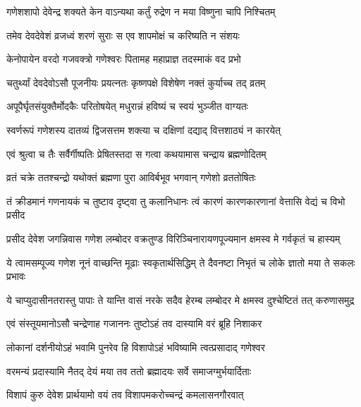 \twolineshloka
{गणेशशापो देवेन्द्र शक्यते केन वाऽन्यथा}
{कर्तुं रुद्रेण न मया विष्णुना चापि निश्चितम्}%

\twolineshloka
{तमेव देवदेवेशं व्रजध्वं शरणं सुराः}
{स एव शापमोक्षं च करिष्यति न संशयः}%


\twolineshloka
{केनोपायेन वरदो गजवक्त्रो गणेश्वरः}
{पितामह महाप्राज्ञ तदस्माकं वद प्रभो}%


\twolineshloka
{चतुर्थ्यां देवदेवोऽसौ पूजनीयः प्रयत्नतः}
{कृष्णपक्षे विशेषेण नक्तं कुर्याच्च तद् व्रतम्}%

\twolineshloka
{अपूपैर्घृतसंयुक्तैर्मोदकैः परितोषयेत्}
{मधुरान्नं हविष्यं च स्वयं भुञ्जीत वाग्यतः}%

\twolineshloka
{स्वर्णरूपं गणेशस्य दातव्यं द्विजसत्तम}
{शक्त्या च दक्षिणां दद्याद् वित्तशाठ्यं न कारयेत्}%

\twolineshloka
{एवं श्रुत्वा च तैः सर्वैर्गीष्पतिः प्रेषितस्तदा}
{स गत्वा कथयामास चन्द्राय ब्रह्मणोदितम्}%

\twolineshloka
{व्रतं चक्रे ततश्चन्द्रो यथोक्तं ब्रह्मणा पुरा}
{आविर्बभूव भगवान् गणेशो व्रततोषितः}%

\fourlineindentedshloka
{तं क्रीडमानं गणनायकं च}
{तुष्टाव दृष्ट्वा तु कलानिधानः}
{त्वं कारणं कारणकारणानां}
{वेत्तासि वेद्यं च विभो प्रसीद}%

\fourlineindentedshloka
{प्रसीद देवेश जगन्निवास}
{गणेश लम्बोदर वक्रतुण्ड}
{विरिञ्चिनारायणपूज्यमान}
{क्षमस्व मे गर्वकृतं च हास्यम्}%

\fourlineindentedshloka
{ये त्वामसम्पूज्य गणेश नूनं}
{वाच्छन्ति मूढाः स्वकृतार्थसिद्धिम्}
{ते दैवनष्टा निभृतं च लोके}
{ज्ञातो मया ते सकलः प्रभावः}%

\fourlineindentedshloka
{ये चाप्युदासीनतरास्तु पापाः}
{ते यान्ति वासं नरके सदैव}
{हेरम्ब लम्बोदर मे क्षमस्व}
{दुश्चेष्टितं तत् करुणासमुद्र}%

\twolineshloka
{एवं संस्तूयमानोऽसौ चन्द्रेणाह गजाननः}
{तुष्टोऽहं तव दास्यामि वरं ब्रूहि निशाकर}%


\twolineshloka
{लोकानां दर्शनीयोऽहं भवामि पुनरेव हि}
{विशापोऽहं भविष्यामि त्वत्प्रसादाद् गणेश्वर}%


\twolineshloka
{वरमन्यं प्रदास्यामि नैतद् देयं मया तव}
{ततो ब्रह्मादयः सर्वे समाजग्मुर्भयार्दिताः}%

\twolineshloka
{विशापं कुरु देवेश प्रार्थयामो वयं तव}
{विशापमकरोच्चन्द्रं कमलासनगौरवात्}%

